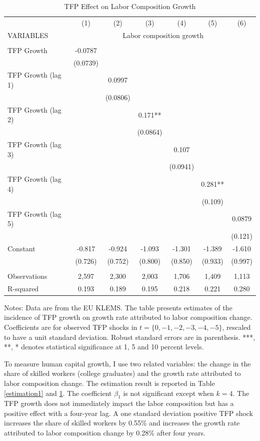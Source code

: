 \documentclass[12pt]{article}
\begin{document}
\begin{appendices}
\begin{table}[h!]
\begin{center}
\scriptsize
\begin{tabular}{lcccccc} \hline \hline
 & (1) & (2) & (3) & (4) & (5) & (6)\\
VARIABLES & \multicolumn{6}{c}{Labor composition growth} \\ \hline
 &  &  &  &  &  &  \\
TFP Growth & -0.0787 &  &  &  &  &  \\
 & (0.0739) &  &  &  &  &  \\
TFP Growth (lag 1) &  & 0.0997 &  &  &  &  \\
 &  & (0.0806) &  &  &  &  \\
TFP Growth (lag 2) &  &  & 0.171** &  &  &  \\
 &  &  & (0.0864) &  &  &  \\
TFP Growth (lag 3) &  &  &  & 0.107 &  &  \\
 &  &  &  & (0.0941) &  &  \\
TFP Growth (lag 4) &  &  &  &  & 0.281** &  \\
 &  &  &  &  & (0.109) &  \\
TFP Growth (lag 5) &  &  &  &  &  & 0.0879 \\
 &  &  &  &  &  & (0.121) \\
Constant & -0.817 & -0.924 & -1.093 & -1.301 & -1.389 & -1.610 \\
 & (0.726) & (0.752) & (0.800) & (0.850) & (0.933) & (0.997) \\
 &  &  &  &  &  &  \\
Observations & 2,597 & 2,300 & 2,003 & 1,706 & 1,409 & 1,113 \\
 R-squared & 0.193 & 0.189 & 0.195 & 0.218 & 0.221 & 0.280 \\ \hline
\end{tabular}
\end{center}
\caption{TFP Effect on Labor Composition Growth}
\label{estimation2}
{\scriptsize Notes: Data are from the EU KLEMS. The table presents estimates of the incidence of TFP growth on growth rate attributed to labor composition change. Coefficients are for observed TFP shocks in $t = \{0,-1,-2,-3,-4,-5\}$, rescaled to have a unit standard deviation. Robust standard errors are in parenthesis. ***, **, * denotes statistical significance at 1, 5 and 10 percent levels.}
\end{table}

To measure human capital growth, I use two related variables: the change in the share of skilled workers (college graduates) and the growth rate attributed to labor composition change. The estimation result is reported in Table \ref{estimation1} and \ref{estimation2}. The coefficient $\beta_{1}$ is not significant except when $k=4$. The TFP growth does not immediately impact the labor composition but has a positive effect with a four-year lag. A one standard deviation positive TFP shock increases the share of skilled workers by 0.55\% and increases the growth rate attributed to labor composition change by 0.28\% after four years. 


\end{appendices}
\end{document}
